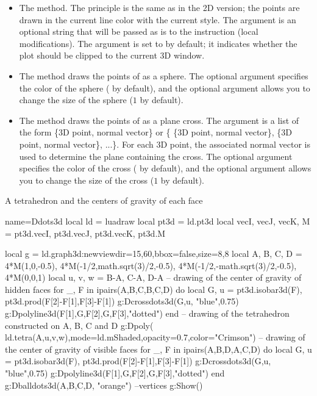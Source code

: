 \begin{itemize}
    \item The  method. The principle is the same as in the 2D version; the points are drawn in the current line color with the current style. The  argument is an optional string that will be passed as is to the \drawcmd instruction (local modifications). The  argument is set to \false by default; it indicates whether the plot should be clipped to the current 3D window.

    \item The  method draws the points of  as a sphere. The optional  argument specifies the color of the sphere ( by default), and the optional  argument allows you to change the size of the sphere ($1$ by default).

    \item The  method draws the points of  as a plane cross. The argument  is a list of the form \{3D point, normal vector\} or \{ \{3D point, normal vector\}, \{3D point, normal vector\}, ...\}. For each 3D point, the associated normal vector is used to determine the plane containing the cross. The optional  argument specifies the color of the cross ( by default), and the optional  argument allows you to change the size of the cross ($1$ by default).
\end{itemize}

\begin{demo}{A tetrahedron and the centers of gravity of each face}
\begin{luadraw}{name=Ddots3d}
local ld = luadraw
local pt3d = ld.pt3d
local vecI, vecJ, vecK, M = pt3d.vecI, pt3d.vecJ, pt3d.vecK, pt3d.M

local g = ld.graph3d:new{viewdir={15,60},bbox=false,size={8,8}}
local A, B, C, D = 4*M(1,0,-0.5), 4*M(-1/2,math.sqrt(3)/2,-0.5), 4*M(-1/2,-math.sqrt(3)/2,-0.5), 4*M(0,0,1)
local u, v, w = B-A, C-A, D-A
-- drawing of the center of gravity of hidden faces
for _, F in ipairs({{A,B,C},{B,C,D}}) do
local G, u = pt3d.isobar3d(F), pt3d.prod(F[2]-F[1],F[3]-F[1])
g:Dcrossdots3d({G,u}, "blue",0.75)
g:Dpolyline3d({{F[1],G,F[2]},{G,F[3]}},"dotted")
end
-- drawing of the tetrahedron constructed on A, B, C and D
g:Dpoly( ld.tetra(A,u,v,w),{mode=ld.mShaded,opacity=0.7,color="Crimson"})
-- drawing of the center of gravity of visible faces
for _, F in ipairs({{A,B,D},{A,C,D}}) do
    local G, u = pt3d.isobar3d(F), pt3d.prod(F[2]-F[1],F[3]-F[1])
    g:Dcrossdots3d({G,u}, "blue",0.75)
    g:Dpolyline3d({{F[1],G,F[2]},{G,F[3]}},"dotted")
end
g:Dballdots3d({A,B,C,D}, "orange") --vertices
g:Show()
\end{luadraw}
\end{demo}

